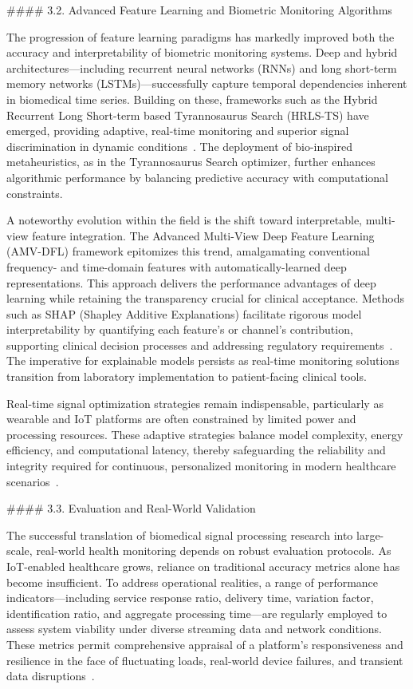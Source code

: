 \documentclass[11pt]{article}
\begin{document}
#### 3.2. Advanced Feature Learning and Biometric Monitoring Algorithms

The progression of feature learning paradigms has markedly improved both the accuracy and interpretability of biometric monitoring systems. Deep and hybrid architectures—including recurrent neural networks (RNNs) and long short-term memory networks (LSTMs)—successfully capture temporal dependencies inherent in biomedical time series. Building on these, frameworks such as the Hybrid Recurrent Long Short-term based Tyrannosaurus Search (HRLS-TS) have emerged, providing adaptive, real-time monitoring and superior signal discrimination in dynamic conditions~\cite{ref107}. The deployment of bio-inspired metaheuristics, as in the Tyrannosaurus Search optimizer, further enhances algorithmic performance by balancing predictive accuracy with computational constraints.

A noteworthy evolution within the field is the shift toward interpretable, multi-view feature integration. The Advanced Multi-View Deep Feature Learning (AMV-DFL) framework epitomizes this trend, amalgamating conventional frequency- and time-domain features with automatically-learned deep representations. This approach delivers the performance advantages of deep learning while retaining the transparency crucial for clinical acceptance. Methods such as SHAP (Shapley Additive Explanations) facilitate rigorous model interpretability by quantifying each feature's or channel's contribution, supporting clinical decision processes and addressing regulatory requirements~\cite{ref98,ref107}. The imperative for explainable models persists as real-time monitoring solutions transition from laboratory implementation to patient-facing clinical tools.

Real-time signal optimization strategies remain indispensable, particularly as wearable and IoT platforms are often constrained by limited power and processing resources. These adaptive strategies balance model complexity, energy efficiency, and computational latency, thereby safeguarding the reliability and integrity required for continuous, personalized monitoring in modern healthcare scenarios~\cite{ref107}.

#### 3.3. Evaluation and Real-World Validation

The successful translation of biomedical signal processing research into large-scale, real-world health monitoring depends on robust evaluation protocols. As IoT-enabled healthcare grows, reliance on traditional accuracy metrics alone has become insufficient. To address operational realities, a range of performance indicators—including service response ratio, delivery time, variation factor, identification ratio, and aggregate processing time—are regularly employed to assess system viability under diverse streaming data and network conditions. These metrics permit comprehensive appraisal of a platform’s responsiveness and resilience in the face of fluctuating loads, real-world device failures, and transient data disruptions~\cite{ref106}.
\end{document}
